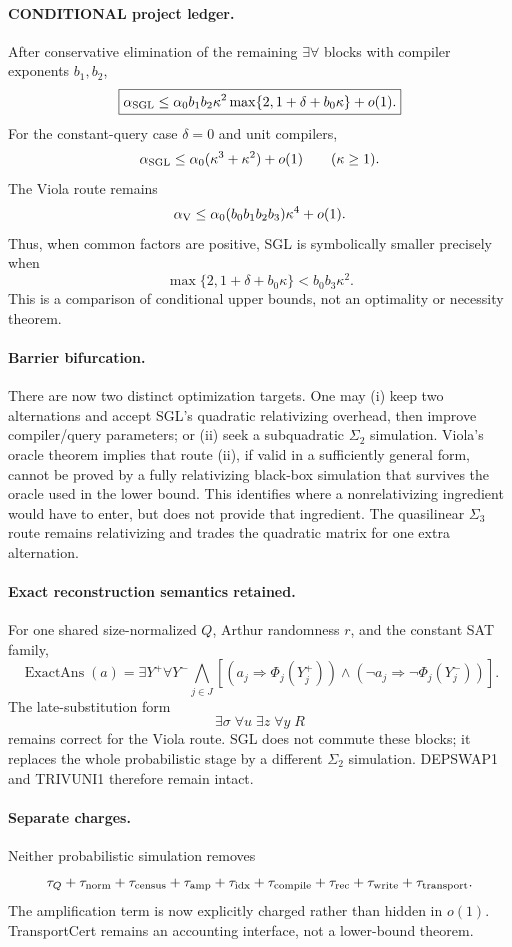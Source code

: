 \documentclass[11pt]{article}
\begin{document}
\paragraph{CONDITIONAL project ledger.}
After conservative elimination of the remaining $\exists\forall$ blocks with compiler exponents $b_1,b_2$,
\[
\boxed{
\alpha_{\rm SGL}
\le
\alpha_0 b_1b_2\kappa^2
\max\{2,1+\delta+b_0\kappa\}+o(1).
}
\]
For the constant-query case $\delta=0$ and unit compilers,
\[
\alpha_{\rm SGL}\le\alpha_0(\kappa^3+\kappa^2)+o(1)
\qquad(\kappa\ge1).
\]
The Viola route remains
\[
\alpha_{\rm V}\le\alpha_0(b_0b_1b_2b_3)\kappa^4+o(1).
\]
Thus, when common factors are positive, SGL is symbolically smaller precisely when
\[
\boxed{
\max\{2,1+\delta+b_0\kappa\}<b_0b_3\kappa^2.
}
\]
This is a comparison of conditional upper bounds, not an optimality or necessity theorem.

\paragraph{Barrier bifurcation.}
There are now two distinct optimization targets. One may (i) keep two alternations and accept SGL's quadratic relativizing overhead, then improve compiler/query parameters; or (ii) seek a subquadratic $\Sigma_2$ simulation. Viola's oracle theorem implies that route (ii), if valid in a sufficiently general form, cannot be proved by a fully relativizing black-box simulation that survives the oracle used in the lower bound. This identifies where a nonrelativizing ingredient would have to enter, but does not provide that ingredient. The quasilinear $\Sigma_3$ route remains relativizing and trades the quadratic matrix for one extra alternation.

\paragraph{Exact reconstruction semantics retained.}
For one shared size-normalized $Q$, Arthur randomness $r$, and the constant SAT family,
\[
\operatorname{ExactAns}(a)=
\exists Y^+\forall Y^-
\bigwedge_{j\in J}
[(a_j\Rightarrow\Phi_j(Y_j^+))\wedge
(\neg a_j\Rightarrow\neg\Phi_j(Y_j^-))].
\]
The late-substitution form
\[
\exists\sigma\;\forall u\;\exists z\;\forall y\;R
\]
remains correct for the Viola route. SGL does not commute these blocks; it replaces the whole probabilistic stage by a different $\Sigma_2$ simulation. DEPSWAP1 and TRIVUNI1 therefore remain intact.

\paragraph{Separate charges.}
Neither probabilistic simulation removes
\[
\tau_Q+\tau_{\rm norm}+\tau_{\rm census}+\tau_{\rm amp}
+\tau_{\rm idx}+\tau_{\rm compile}+\tau_{\rm rec}
+\tau_{\rm write}+\tau_{\rm transport}.
\]
The amplification term is now explicitly charged rather than hidden in $o(1)$. TransportCert remains an accounting interface, not a lower-bound theorem.
\end{document}

